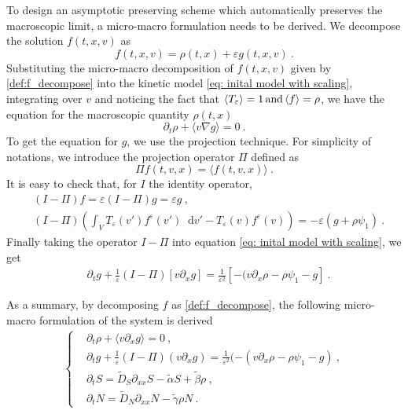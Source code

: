 \documentclass[11pt,twoside]{article}
\newcommand*\diff{\mathop{}\!\mathrm{d}}
\numberwithin{equation}{section}
\begin{document}
To design an asymptotic preserving scheme which automatically preserves the macroscopic limit, a micro-macro formulation needs to be derived. 
We decompose the solution $f(t,x,v)$ as 
\begin{equation}\label{def:f_decompose}
    f(t,x,v) = \rho(t,x) + \varepsilon g(t,x,v)\ .
\end{equation}
Substituting the micro-macro decomposition of $f(t, x, v)$ given by \eqref{def:f_decompose} into the  kinetic model \eqref{eq: inital model with scaling}, integrating over $v$ and noticing the fact that $\langle T_\varepsilon \rangle=1 \, \textnormal{and}\, \langle f\rangle = \rho$, we have the equation for the macroscopic quantity $\rho(t, x)$
\begin{equation*}
    \partial_t \rho +  \langle v \nabla  g\rangle  =  0\ .
\end{equation*}
To get the equation for $g$, we use the projection technique. 
For simplicity of notations, we introduce the projection operator $\Pi$ defined as 
\begin{equation*}
    \Pi f(t,{v},{x}) = \langle f(t,{v},{x})\rangle \ .
\end{equation*}
It is easy to check that, {for $I$ the identity operator,} 
\begin{align*}
    & (I - \Pi) f = \varepsilon(I - \Pi) g = \varepsilon g\ ,\\
    & (I - \Pi) \left(\int_VT_\varepsilon(v')f^\varepsilon(v')\diff v'-T_\varepsilon(v)f^\varepsilon(v)\right) = -\varepsilon\left(g+\rho \psi_1 \right) \ .
\end{align*}
Finally taking the operator $I-\Pi$ into equation \eqref{eq: inital model with scaling}, we get
\begin{align*}
    &\partial_t g + \frac{1}{\varepsilon} (I-\Pi)\left[v \partial_x g \right] 
    = \frac{1}{\varepsilon^2}\left[-(v\partial_x\rho-\rho \psi_1  - g\right] \ .
\end{align*}

As a summary, by decomposing $f$ as \eqref{def:f_decompose}, the following micro-macro formulation of the system is derived
\begin{align}\label{eq:macro_micro}
\begin{cases}
	&\partial_t \rho +  \langle v\partial_x g\rangle  = 0\ , \\
	&\partial_t g + \frac{1}{\varepsilon} (I-\Pi) ({v}\partial_x g) = \frac{1}{\varepsilon^2}(-({v}\partial_x \rho-\rho\psi_1 -  g) \ ,\\
	&  \partial_t S = \tilde{D}_S\partial_{xx} S -\tilde{\alpha}S+\tilde{\beta}\rho\ ,\\
 & \partial_tN = \tilde{D}_N\partial_{xx} N-\tilde{\gamma}\rho N\ .
\end{cases}
\end{align}
\end{document}
